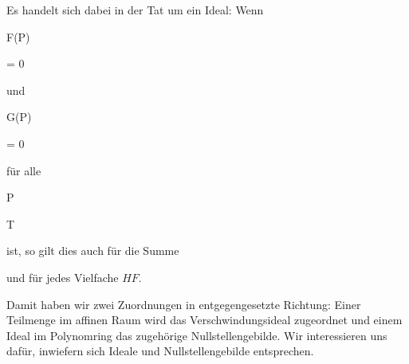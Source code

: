 Es handelt sich dabei in der Tat um ein Ideal: Wenn


\mavergleichskette


{\vergleichskette


{ F(P)
}


{ = }{ 0
}


{  }{
}


{    }{
}


{   }{
}


}
{}{}{}
und


\mavergleichskette


{\vergleichskette


{ G(P)
}


{ = }{ 0
}


{  }{
}


{    }{
}


{   }{
}


}
{}{}{}
für alle


\mavergleichskette


{\vergleichskette


{ P
}


{ \in }{ T
}


{  }{
}


{    }{
}


{   }{
}


}
{}{}{}
ist, so gilt dies auch für die Summe


 und für jedes Vielfache $HF$.


Damit haben wir zwei Zuordnungen in entgegengesetzte Richtung: Einer Teilmenge im affinen Raum wird das Verschwindungsideal zugeordnet und einem Ideal im Polynomring das zugehörige Nullstellengebilde. Wir interessieren uns dafür, inwiefern sich Ideale und Nullstellengebilde entsprechen.





